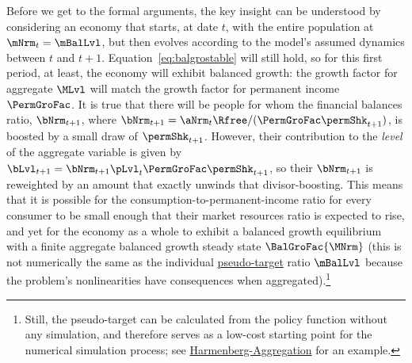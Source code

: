 \documentclass[\econtexRoot/BufferStockTheory]{subfiles}
\begin{document}
Before we get to the formal arguments, the key insight can be understood by considering an economy that starts, at date $t$, with the entire population at $\mNrm_{t}=\mBalLvl$, but then evolves according to the model's assumed dynamics between $t$ and $t+1$.
Equation~\eqref{eq:balgrostable} will still hold, so for this first period, at least, the economy will exhibit balanced growth: the growth factor for aggregate $\MLvl$ will match the growth factor for permanent income $\PermGroFac$.
It is true that there will be people for whom the financial balances ratio, $\bNrm_{t+1}$, where $\bNrm_{t+1} = \aNrm_{t}\Rfree/(\PermGroFac\permShk_{t+1})$, is boosted by a small draw of $\permShk_{t+1}$.
However, their contribution to the \textit{level} of the aggregate variable is given by $\bLvl_{t+1}=\bNrm_{t+1}\pLvl_{t}\PermGroFac\permShk_{t+1}$, so their $\bNrm_{t+1}$ is reweighted by an amount that exactly unwinds that divisor-boosting.
This means that it is possible for the consumption-to-permanent-income ratio for every consumer to be small enough that their market resources ratio is expected to rise, and yet for the economy as a whole to exhibit a balanced growth equilibrium with a finite aggregate balanced growth steady state $\BalGroFac{\MNrm}$ (this is not numerically the same as the individual \hyperlink{pseudo-steady-state}{pseudo-target} ratio $\mBalLvl$ because the problem's nonlinearities have consequences when aggregated).\footnote{Still, the pseudo-target can be calculated from the policy function without any simulation, and therefore serves as a low-cost starting point for the numerical simulation process; see \href{https://econ-ark.org/materials/harmenberg-aggregation?launch}{Harmenberg-Aggregation} for an example.}

\end{document}
